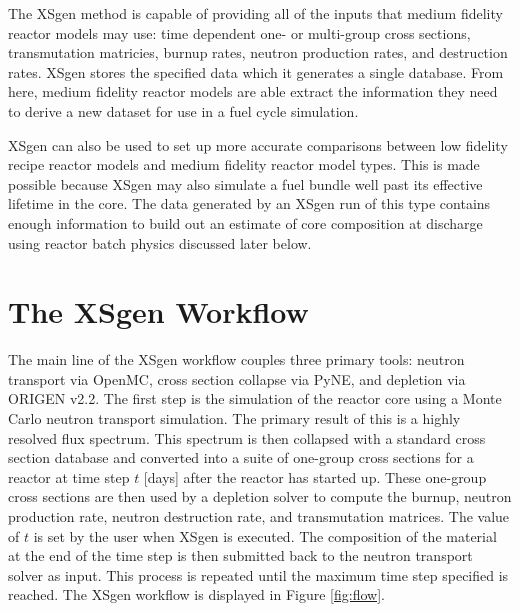 \documentclass{article}
\begin{document}
The XSgen method is capable of providing all of the inputs that medium fidelity reactor models
may use: time dependent one- or multi-group cross sections, transmutation matricies,
burnup rates, neutron production rates, and destruction rates.
XSgen stores the specified data which it generates a single database.
From here, medium fidelity reactor models are able extract the information they need to
derive a new dataset for use in a fuel cycle simulation.

XSgen can also be used to set up more accurate comparisons between low fidelity recipe reactor
models and medium fidelity reactor model types. This is made possible because XSgen may also
simulate a fuel bundle well past its effective lifetime in the core. The data generated by an
XSgen run of this type contains enough information to build out an estimate of core composition
at discharge using reactor batch physics discussed later below.

\section{The XSgen Workflow}
\label{sec-workflow}

The main line of the XSgen workflow couples three primary tools: neutron transport via OpenMC,
cross section collapse via PyNE, and depletion via ORIGEN v2.2. The first step is the simulation
of the reactor core using a Monte Carlo neutron transport simulation. The primary result of
this is a highly resolved flux spectrum. This spectrum is then collapsed with a standard
cross section database and converted into a suite of one-group cross sections for a reactor
at time step $t$ [days] after the reactor has started up. These one-group cross sections are
then used by a depletion solver to compute the burnup, neutron production rate, neutron
destruction rate, and transmutation matrices. The value of $t$ is set by the user when XSgen
is executed. The composition of the material at the end of the time step is then submitted
back to the neutron transport solver as input. This process is repeated until the maximum time
step specified is reached. The XSgen workflow is displayed in Figure \ref{fig:flow}.
\end{document}
